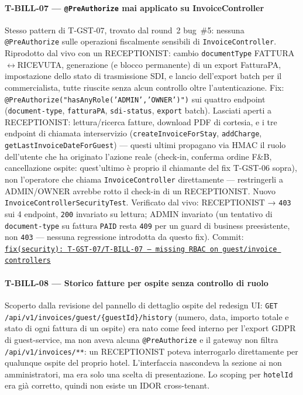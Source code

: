 ﻿\documentclass[a4paper,12pt]{report}
\newcommand{\commitref}[2]{\texttt{\small \href{https://github.com/diegoandruccioli/hotel-pms/commit/#1}{#2}}}
\begin{document}
\paragraph{T-BILL-07 --- \texttt{@PreAuthorize} mai applicato su InvoiceController}
Stesso pattern di T-GST-07, trovato dal round~2 bug~\#5: nessuna
\texttt{@PreAuthorize} sulle operazioni fiscalmente sensibili di
\texttt{InvoiceController}. Riprodotto dal vivo con un RECEPTIONIST:
cambio \texttt{documentType} FATTURA$\leftrightarrow$RICEVUTA, generazione (e blocco
permanente) di un export FatturaPA, impostazione dello stato di
trasmissione SDI, e lancio dell'export batch per il commercialista,
tutte riuscite senza alcun controllo oltre l'autenticazione.
Fix: \texttt{@PreAuthorize("hasAnyRole('ADMIN','OWNER')")} sui quattro
endpoint (\texttt{document-type}, \texttt{fatturaPA}, \texttt{sdi-status},
\texttt{export} batch). Lasciati aperti a RECEPTIONIST: lettura/ricerca
fatture, download PDF di cortesia, e i tre endpoint di chiamata
interservizio (\texttt{createInvoiceForStay}, \texttt{addCharge},
\texttt{getLastInvoiceDateForGuest}) --- questi ultimi propagano via HMAC
il ruolo dell'utente che ha originato l'azione reale (check-in, conferma
ordine F\&B, cancellazione ospite: quest'ultimo è proprio il chiamante
del fix T-GST-06 sopra), non l'operatore che chiama \texttt{InvoiceController}
direttamente --- restringerli a ADMIN/OWNER avrebbe rotto il check-in di
un RECEPTIONIST. Nuovo \texttt{InvoiceControllerSecurityTest}. Verificato
dal vivo: RECEPTIONIST → \texttt{403} sui 4 endpoint, \texttt{200}
invariato su lettura; ADMIN invariato (un tentativo di \texttt{document-type}
su fattura \texttt{PAID} resta \texttt{409} per un guard di business
preesistente, non \texttt{403} --- nessuna regressione introdotta da questo fix).
Commit: \commitref{a87d329}{fix(security): T-GST-07/T-BILL-07 --- missing RBAC on guest/invoice controllers}

\paragraph{T-BILL-08 --- Storico fatture per ospite senza controllo di ruolo}
Scoperto dalla revisione del pannello di dettaglio ospite del redesign UI:
\texttt{GET /api/v1/invoices/guest/\{guestId\}/history} (numero, data,
importo totale e stato di ogni fattura di un ospite) era nato come feed
interno per l'export GDPR di guest-service, ma non aveva alcuna
\texttt{@PreAuthorize} e il gateway non filtra \texttt{/api/v1/invoices/**}:
un RECEPTIONIST poteva interrogarlo direttamente per qualunque ospite del
proprio hotel. L'interfaccia nascondeva la sezione ai non amministratori,
ma era solo una scelta di presentazione. Lo scoping per \texttt{hotelId}
era già corretto, quindi non esiste un IDOR cross-tenant.
\end{document}
